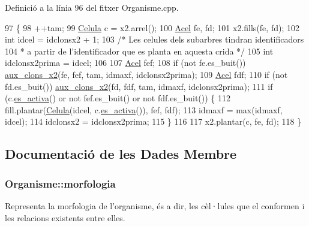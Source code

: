 Definició a la línia 96 del fitxer Organisme.\-cpp.


\begin{DoxyCode}
97                                                         \{
98     ++tam;
99     \hyperlink{class_celula}{Celula} c = x2.arrel();
100     \hyperlink{class_organisme_a6322ecf5313caa7df794a33c4fc58f4e}{Acel} fe, fd;
101     x2.fills(fe, fd);
102     \textcolor{keywordtype}{int} idcel = idclonsx2 + 1;
103     \textcolor{comment}{/* Les celules dels subarbres tindran identificadors
}
104 \textcolor{comment}{     * a partir de l'identificador que es planta en aquesta crida */}
105     \textcolor{keywordtype}{int} idclonsx2prima = idcel;
106 
107     \hyperlink{class_organisme_a6322ecf5313caa7df794a33c4fc58f4e}{Acel} fef;
108     \textcolor{keywordflow}{if} (not fe.es\_buit()) \hyperlink{class_organisme_ab6232adf26f92b75902f25fccdd91a13}{aux\_clons\_x2}(fe, fef, tam, idmaxf, idclonsx2prima);
109     \hyperlink{class_organisme_a6322ecf5313caa7df794a33c4fc58f4e}{Acel} fdf;
110     \textcolor{keywordflow}{if} (not fd.es\_buit()) \hyperlink{class_organisme_ab6232adf26f92b75902f25fccdd91a13}{aux\_clons\_x2}(fd, fdf, tam, idmaxf, idclonsx2prima);
111     \textcolor{keywordflow}{if} (c.\hyperlink{class_celula_a25bbae8df2eb0b60202829321175e3f7}{es\_activa}() or not fef.es\_buit() or not fdf.es\_buit()) \{
112         fill.plantar(\hyperlink{class_celula}{Celula}(idcel, c.\hyperlink{class_celula_a25bbae8df2eb0b60202829321175e3f7}{es\_activa}()), fef, fdf);
113         idmaxf = max(idmaxf, idcel);
114         idclonsx2 = idclonsx2prima;
115     \}
116 
117     x2.plantar(c, fe, fd);
118 \}
\end{DoxyCode}


\subsection{Documentació de les Dades Membre}
\hypertarget{class_organisme_a4f36183d9fb514405176208f7d3f6a96}{
\subsubsection[{morfologia}]{ Organisme\-::morfologia\hspace{0.3cm}{\ttfamily [private]}}}\label{class_organisme_a4f36183d9fb514405176208f7d3f6a96}


Representa la morfologia de l'organisme, és a dir, les cèl·lules que el conformen i les relacions existents entre elles. 



